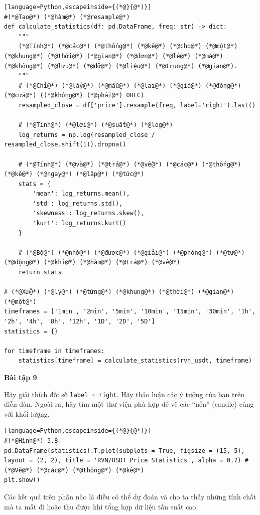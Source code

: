 \begin{lstlisting}[language=Python,escapeinside={(*@}{@*)}]
#(*@Tạo@*) (*@hàm@*) (*@resample@*)
def calculate_statistics(df: pd.DataFrame, freq: str) -> dict:
    """
    (*@Tính@*) (*@các@*) (*@thống@*) (*@kê@*) (*@cho@*) (*@một@*) (*@khung@*) (*@thời@*) (*@gian@*) (*@đơn@*) (*@lẻ@*) (*@mà@*) (*@không@*) (*@lưu@*) (*@dữ@*) (*@liệu@*) (*@trung@*) (*@gian@*).
    """
    # (*@Chỉ@*) (*@lấy@*) (*@mẫu@*) (*@lại@*) (*@giá@*) (*@đóng@*) (*@cửa@*) ((*@không@*) (*@phải@*) OHLC)
    resampled_close = df['price'].resample(freq, label='right').last()
    
    # (*@Tính@*) (*@lợi@*) (*@suất@*) (*@log@*)
    log_returns = np.log(resampled_close / resampled_close.shift(1)).dropna()
    
    # (*@Tính@*) (*@và@*) (*@trả@*) (*@về@*) (*@các@*) (*@thống@*) (*@kê@*) (*@ngay@*) (*@lập@*) (*@tức@*)
    stats = {
        'mean': log_returns.mean(),
        'std': log_returns.std(),
        'skewness': log_returns.skew(),
        'kurt': log_returns.kurt()
    }
    
    # (*@Bộ@*) (*@nhớ@*) (*@được@*) (*@giải@*) (*@phóng@*) (*@tự@*) (*@động@*) (*@khi@*) (*@hàm@*) (*@trả@*) (*@về@*)
    return stats

# (*@Xử@*) (*@lý@*) (*@từng@*) (*@khung@*) (*@thời@*) (*@gian@*) (*@một@*)
timeframes = ['1min', '2min', '5min', '10min', '15min', '30min', '1h', '2h', '4h', '8h', '12h', '1D', '2D', '5D']
statistics = {}

for timeframe in timeframes:
    statistics[timeframe] = calculate_statistics(rvn_usdt, timeframe)
\end{lstlisting}

\textbf{Bài tập 9}

Hãy giải thích đối số \texttt{label = right}. Hãy thảo luận các ý tưởng của bạn trên diễn đàn. Ngoài ra, hãy tìm một thư viện phù hợp để vẽ các ``nến'' (candle) cùng với khối lượng.

\begin{lstlisting}[language=Python,escapeinside={(*@}{@*)}]
#(*@Hình@*) 3.8
pd.DataFrame(statistics).T.plot(subplots = True, figsize = (15, 5), layout = (2, 2), title = 'RVN/USDT Price Statistics', alpha = 0.7) # (*@Vẽ@*) (*@các@*) (*@thống@*) (*@kê@*)
plt.show()
\end{lstlisting}


Các kết quả trên phần nào là điều có thể dự đoán và cho ta thấy những tính chất mà ta mất đi hoặc thu được khi tổng hợp dữ liệu tần suất cao.

